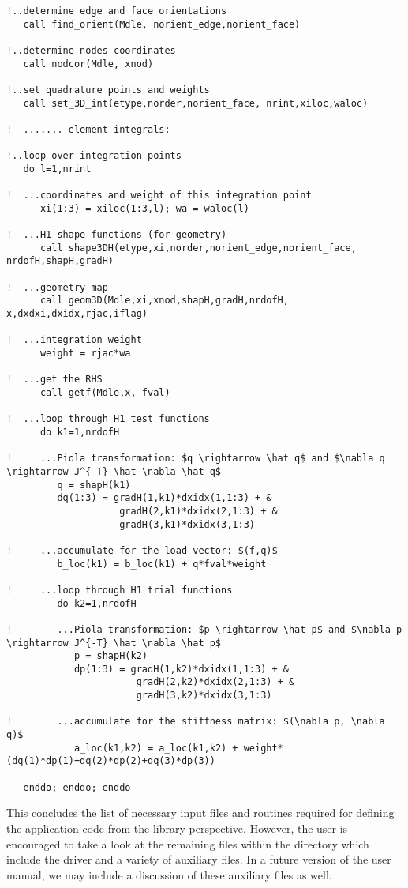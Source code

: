 \begin{itemize}
{\begin{lstlisting}[mathescape,caption=\file{POISSON/GALERKIN/}\routine{elem} routine]
!..determine edge and face orientations
   call find_orient(Mdle, norient_edge,norient_face)
   
!..determine nodes coordinates
   call nodcor(Mdle, xnod)
   
!..set quadrature points and weights
   call set_3D_int(etype,norder,norient_face, nrint,xiloc,waloc)

!  ....... element integrals:

!..loop over integration points
   do l=1,nrint

!  ...coordinates and weight of this integration point
      xi(1:3) = xiloc(1:3,l); wa = waloc(l)

!  ...H1 shape functions (for geometry)
      call shape3DH(etype,xi,norder,norient_edge,norient_face, nrdofH,shapH,gradH)

!  ...geometry map
      call geom3D(Mdle,xi,xnod,shapH,gradH,nrdofH, x,dxdxi,dxidx,rjac,iflag)

!  ...integration weight
      weight = rjac*wa

!  ...get the RHS
      call getf(Mdle,x, fval)

!  ...loop through H1 test functions
      do k1=1,nrdofH

!     ...Piola transformation: $q \rightarrow \hat q$ and $\nabla q \rightarrow J^{-T} \hat \nabla \hat q$
         q = shapH(k1)
         dq(1:3) = gradH(1,k1)*dxidx(1,1:3) + &
                    gradH(2,k1)*dxidx(2,1:3) + &
                    gradH(3,k1)*dxidx(3,1:3)

!     ...accumulate for the load vector: $(f,q)$
         b_loc(k1) = b_loc(k1) + q*fval*weight

!     ...loop through H1 trial functions
         do k2=1,nrdofH

!        ...Piola transformation: $p \rightarrow \hat p$ and $\nabla p \rightarrow J^{-T} \hat \nabla \hat p$
            p = shapH(k2)
            dp(1:3) = gradH(1,k2)*dxidx(1,1:3) + &
                       gradH(2,k2)*dxidx(2,1:3) + &
                       gradH(3,k2)*dxidx(3,1:3)

!        ...accumulate for the stiffness matrix: $(\nabla p, \nabla q)$
            a_loc(k1,k2) = a_loc(k1,k2) + weight*(dq(1)*dp(1)+dq(2)*dp(2)+dq(3)*dp(3))

   enddo; enddo; enddo
\end{lstlisting}
	}
\end{itemize}

This concludes the list of necessary input files and routines required for defining the application code from the library-perspective. However, the user is encouraged to take a look at the remaining files within the  directory which include the driver  and a variety of auxiliary files. In a future version of the user manual, we may include a discussion of these auxiliary files as well.

